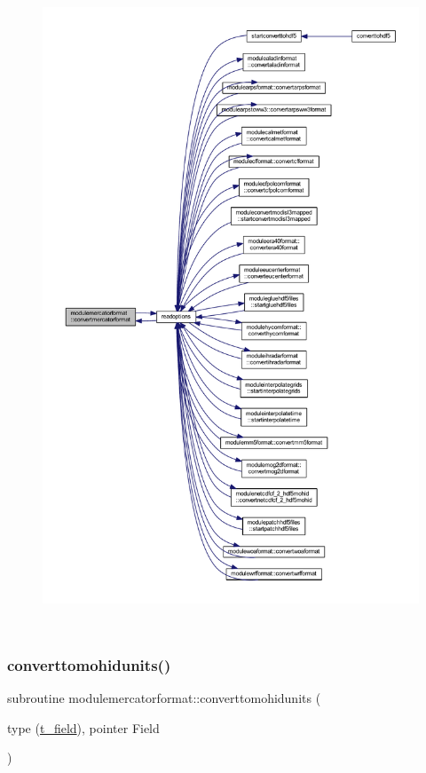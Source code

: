 \begin{figure}[H]
\begin{center}
\leavevmode
\includegraphics[height=550pt]{namespacemodulemercatorformat_ab5fa5a32b4c60eb82b51453effd56cbf_icgraph}
\end{center}
\end{figure}
\mbox{\label{namespacemodulemercatorformat_afe587bb63f0975739ea6aae4c3ce6a6f}} 
\subsubsection{\texorpdfstring{converttomohidunits()}{converttomohidunits()}}
{\footnotesize\ttfamily subroutine modulemercatorformat\+::converttomohidunits (\begin{DoxyParamCaption}\item[{type (\mbox{\hyperlink{structmodulemercatorformat_1_1t__field}{t\+\_\+field}}), pointer}]{Field }\end{DoxyParamCaption})\hspace{0.3cm}{\ttfamily [private]}}

